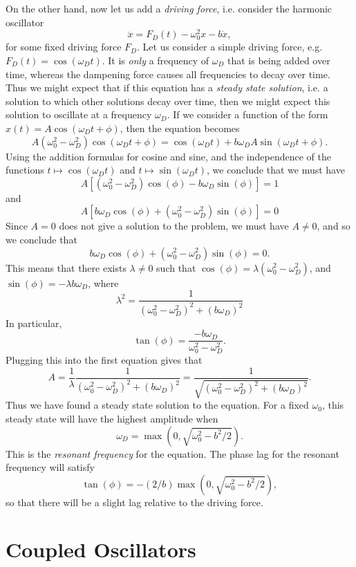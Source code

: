 On the other hand, now let us add a \emph{driving force}, i.e. consider the harmonic oscillator
%
\[ \ddot{x} = F_D(t) - \omega_0^2 x - b\dot{x}, \]
%
for some fixed driving force $F_D$. Let us consider a simple driving force, e.g. $F_D(t) = \cos(\omega_D t)$. It is \emph{only} a frequency of $\omega_D$ that is being added over time, whereas the dampening force causes all frequencies to decay over time. Thus we might expect that if this equation has a \emph{steady state solution}, i.e. a solution to which other solutions decay over time, then we might expect this solution to oscillate at a frequency $\omega_D$. If we consider a function of the form $x(t) = A \cos(\omega_D t + \phi)$, then the equation becomes
%
\[ A (\omega_0^2 - \omega_D^2) \cos(\omega_D t + \phi) = \cos(\omega_D t) + b \omega_D A \sin(\omega_D t + \phi). \]
%
Using the addition formulas for cosine and sine, and the independence of the functions $t \mapsto \cos(\omega_D t)$ and $t \mapsto \sin(\omega_D t)$, we conclude that we must have
%
\[ A [(\omega_0^2 - \omega_D^2) \cos(\phi) - b \omega_D \sin(\phi)] = 1 \]
%
and
%
\[ A [b \omega_D \cos(\phi) + (\omega_0^2 - \omega_D^2) \sin(\phi)] = 0 \]
%
Since $A = 0$ does not give a solution to the problem, we must have $A \neq 0$, and so we conclude that
%
\[ b \omega_D \cos(\phi) + (\omega_0^2 - \omega_D^2) \sin(\phi) = 0. \]
%
This means that there exists $\lambda \neq 0$ such that $\cos(\phi) = \lambda (\omega_0^2 - \omega_D^2)$, and $\sin(\phi) = - \lambda b \omega_D$, where
%
\[ \lambda^2 = \frac{1}{(\omega_0^2 - \omega_D^2)^2 + (b \omega_D)^2} \]
%
In particular,
%
\[ \tan(\phi) = \frac{- b \omega_D}{\omega_0^2 - \omega_D^2}. \]
%
Plugging this into the first equation gives that
%
\[ A = \frac{1}{\lambda} \frac{1}{(\omega_0^2 - \omega_D^2)^2 + (b \omega_D)^2} = \frac{1}{\sqrt{(\omega_0^2 - \omega_D^2)^2 + (b \omega_D)^2}}. \]
%
Thus we have found a steady state solution to the equation. For a fixed $\omega_0$, this steady state will have the highest amplitude when
%
\[ \omega_D = \max \left( 0, \sqrt{\omega_0^2 - b^2/2} \right). \]
%
This is the \emph{resonant frequency} for the equation. The phase lag for the resonant frequency will satisfy
%
\[ \tan(\phi) = - (2/b) \max \left(0, \sqrt{\omega_0^2 - b^2/2} \right), \]
%
so that there will be a slight lag relative to the driving force.

\section{Coupled Oscillators}


